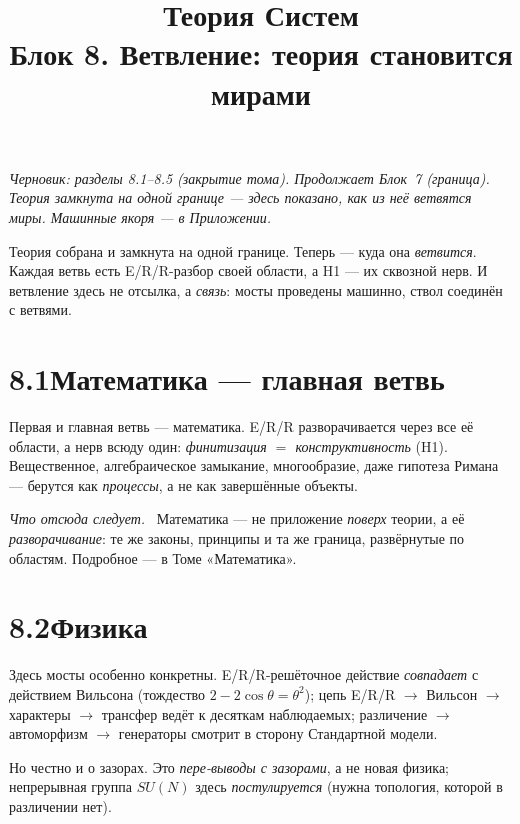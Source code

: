 \documentclass[12pt,a4paper]{article}
\title{\textbf{Теория Систем}\\[2mm]\large Блок 8. Ветвление: теория становится мирами}
\author{}
\date{}
\newcommand{\rezultat}{\medskip\noindent\emph{Что отсюда следует.}\ }
\begin{document}
\maketitle
\thispagestyle{empty}

\noindent\small\textit{Черновик: разделы 8.1--8.5 (закрытие тома). Продолжает Блок~7 (граница).
Теория замкнута на одной границе --- здесь показано, как из неё \emph{ветвятся} миры. Машинные
якоря --- в Приложении.}\normalsize

\bigskip

\noindent Теория собрана и замкнута на одной границе. Теперь --- куда она \emph{ветвится}. Каждая
ветвь есть E/R/R-разбор своей области, а H1 --- их сквозной нерв. И ветвление здесь не отсылка, а
\emph{связь}: мосты проведены машинно, ствол соединён с ветвями.

\section*{8.1\quad Математика --- главная ветвь}

Первая и главная ветвь --- математика. E/R/R разворачивается через все её области, а нерв всюду один:
\emph{финитизация $=$ конструктивность} (H1). Вещественное, алгебраическое замыкание, многообразие,
даже гипотеза Римана --- берутся как \emph{процессы}, а не как завершённые объекты.

\rezultat
Математика --- не приложение \emph{поверх} теории, а её \emph{разворачивание}: те же законы,
принципы и та же граница, развёрнутые по областям. Подробное --- в Томе «Математика».

\section*{8.2\quad Физика}

{\sloppy
Здесь мосты особенно конкретны. E/R/R-решёточное действие \emph{совпадает} с действием Вильсона
(тождество $2-2\cos\theta = \theta^2$); цепь E/R/R $\to$ Вильсон $\to$ характеры $\to$ трансфер
ведёт к десяткам наблюдаемых; различение $\to$ автоморфизм $\to$ генераторы смотрит в сторону
Стандартной модели.

Но честно и о зазорах. Это \emph{пере-выводы с зазорами}, а не новая физика; непрерывная группа
$SU(N)$ здесь \emph{постулируется} (нужна топология, которой в различении нет).\par}
\end{document}
